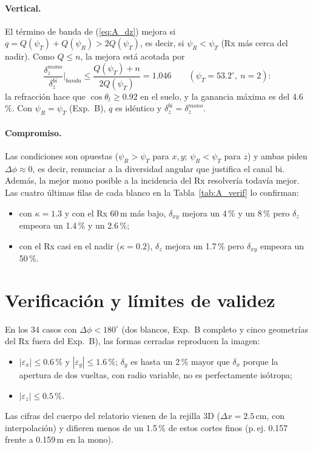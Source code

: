 \paragraph{Vertical.} El término de banda de (\ref{eq:A_dz}) mejora si
$q=Q(\psi_T)+Q(\psi_R)>2Q(\psi_T)$, es decir, si $\psi_R<\psi_T$ (Rx más cerca del nadir).
Como $Q\le n$, la mejora está acotada por
\begin{equation}
  \frac{\delta_z^{mono}}{\delta_z^{bi}}\Big|_{banda}\le\frac{Q(\psi_T)+n}{2Q(\psi_T)}=1.046
  \qquad(\psi_T=53.2^{\circ},\ n=2):
\end{equation}
la refracción hace que $\cos\theta_t\ge0.92$ en el suelo, y la ganancia máxima es del 4.6\,\%. Con
$\psi_R=\psi_T$ (Exp.~B), $q$ es idéntico y $\delta_z^{bi}=\delta_z^{mono}$.

\paragraph{Compromiso.} Las condiciones son opuestas ($\psi_R>\psi_T$ para $x,y$;
$\psi_R<\psi_T$ para $z$) y ambas piden $\Delta\phi\approx0$, es decir, renunciar a la
diversidad angular que justifica el canal bi. Además, la mejor mono posible a la incidencia
del Rx resolvería todavía mejor. Las cuatro últimas filas de cada blanco en la
Tabla~\ref{tab:A_verif} lo confirman:
\begin{itemize}[itemsep=1pt]
  \item con $\kappa=1.3$ y con el Rx 60\,m más bajo, $\delta_{xy}$ mejora un 4\,\% y un 8\,\%
  pero $\delta_z$ empeora un 1.4\,\% y un 2.6\,\%;
  \item con el Rx casi en el nadir ($\kappa=0.2$), $\delta_z$ mejora un 1.7\,\% pero
  $\delta_{xy}$ empeora un 50\,\%.
\end{itemize}

\section{Verificación y límites de validez}



En los 34 casos con $\Delta\phi<180^{\circ}$ (dos blancos, Exp.~B completo y cinco geometrías
del Rx fuera del Exp.~B), las formas cerradas reproducen la imagen:
\begin{itemize}[itemsep=1pt]
  \item $|\varepsilon_x|\le0.6$\,\% y $|\varepsilon_y|\le1.6$\,\%; $\delta_y$ es hasta un 2\,\%
  mayor que $\delta_x$ porque la apertura de dos vueltas, con radio variable, no es
  perfectamente isótropa;
  \item $|\varepsilon_z|\le0.5$\,\%.
\end{itemize}
Las cifras del cuerpo del relatorio vienen de la rejilla 3D ($\Delta x=2.5$\,cm, con
interpolación) y difieren menos de un 1.5\,\% de estos cortes finos (p.\,ej. 0.157 frente a
0.159\,m en la mono).

